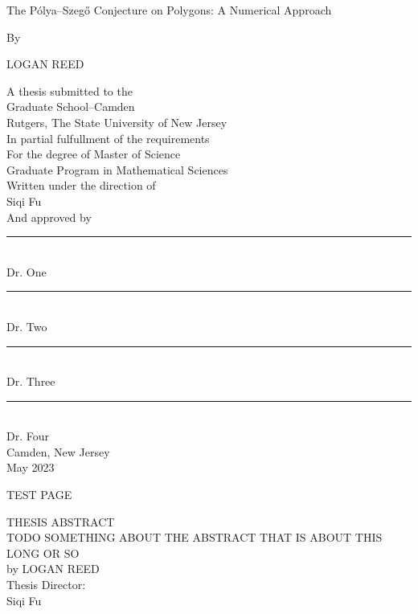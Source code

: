 \documentclass[12pt]{report}
\numberwithin{definition}{section}
\begin{document}
  \doublespacing
  
\begin{titlepage}

   \begin{center}
      

      The Pólya–Szegő Conjecture on Polygons: A Numerical Approach

            
     
       By
              


      LOGAN REED

     
            
        A thesis submitted to the \\
       Graduate School–Camden\\
       Rutgers, The State University of New Jersey\\
       In partial fulfullment of the requirements\\
       For the degree of Master of Science\\
       Graduate Program in Mathematical Sciences \\
       Written under the direction of \\
       Siqi Fu\\
       And approved by \\
       \noindent\rule{4cm}{0.4pt}\\
       Dr. One\\
      \noindent\rule{4cm}{0.4pt}\\
       Dr. Two\\
           \noindent\rule{4cm}{0.4pt}\\
       Dr. Three\\
                \noindent\rule{4cm}{0.4pt}\\
       Dr. Four\\
         \vspace{0.8cm}
       Camden, New Jersey\\
       May 2023
            
       \vspace{0.8cm}
     
  
        
            
   \end{center}
   
\end{titlepage}




\break
TEST PAGE

  \begin{center}

\break
  THESIS ABSTRACT\\
 
    TODO SOMETHING ABOUT THE ABSTRACT THAT IS ABOUT THIS LONG OR SO \\
         by LOGAN REED\\
     
     Thesis Director: \\
     Siqi Fu
  \end {center}
\end{document}

